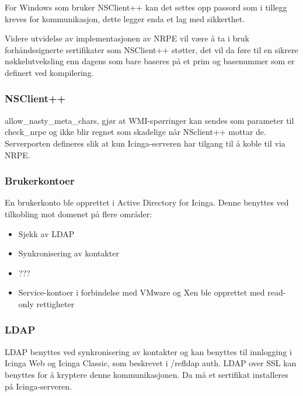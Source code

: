 For Windows som bruker NSClient++ kan det settes opp passord som i tillegg kreves for kommunikasjon, dette legger enda et lag med sikkerthet.

Videre utvidelse av implementasjonen av NRPE vil være å ta i bruk forhåndssignerte sertifikater 
som NSClient++ støtter, det vil da føre til en sikrere nøkkelutveksling enn dagens som bare baseres på et prim og basenummer som er definert ved kompilering.

\subsubsection{NSClient++}
allow\_nasty\_meta\_chars, gjør at WMI-spørringer kan sendes som parameter til check\_nrpe og ikke blir regnet som skadelige når NSclient++ mottar de. Serverporten defineres slik at kun Icinga-serveren har tilgang til å koble til via NRPE.

\subsubsection{Brukerkontoer}
En brukerkonto ble opprettet i Active Directory for Icinga. Denne benyttes ved tilkobling mot domenet på flere områder:
\begin{itemize}
	\item Sjekk av LDAP
	\item Synkronisering av kontakter
	\item ???
	\item Service-kontoer i forbindelse med VMware og Xen ble opprettet med read-only rettigheter
\end{itemize}

\subsubsection{LDAP}
LDAP benyttes ved synkronisering av kontakter og kan benyttes til innlogging i Icinga Web og Icinga Classic, som beskrevet i /ref{ldap auth}. LDAP over SSL kan benyttes for å kryptere denne kommunikasjonen. Da må et sertifikat installeres på Icinga-serveren.
